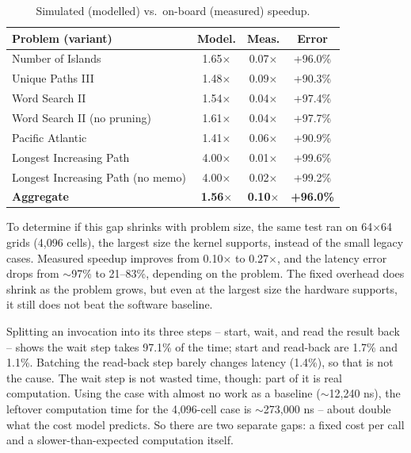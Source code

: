 \documentclass[conference]{IEEEtran}
\begin{document}
\begin{table}[h]
\centering
\footnotesize
\caption{Simulated (modelled) vs.\ on-board (measured) speedup.}
\label{tab:cost_model_correlation}
\renewcommand{\arraystretch}{1.15}
\begin{tabular}{@{}p{3.1cm}ccc@{}}
\toprule
\textbf{Problem (variant)} & \textbf{Model.} & \textbf{Meas.} & \textbf{Error} \\
\midrule
Number of Islands & 1.65$\times$ & 0.07$\times$ & +96.0\% \\
Unique Paths III & 1.48$\times$ & 0.09$\times$ & +90.3\% \\
Word Search II & 1.54$\times$ & 0.04$\times$ & +97.4\% \\
Word Search II (no pruning) & 1.61$\times$ & 0.04$\times$ & +97.7\% \\
Pacific Atlantic & 1.41$\times$ & 0.06$\times$ & +90.9\% \\
Longest Increasing Path & 4.00$\times$ & 0.01$\times$ & +99.6\% \\
Longest Increasing Path (no memo) & 4.00$\times$ & 0.02$\times$ & +99.2\% \\
\midrule
\textbf{Aggregate} & \textbf{1.56$\times$} & \textbf{0.10$\times$} & \textbf{+96.0\%} \\
\bottomrule
\end{tabular}
\end{table}

To determine if this gap shrinks with problem size, the same test ran on
64$\times$64 grids (4,096 cells), the largest size the kernel supports,
instead of the small legacy cases. Measured speedup improves from
0.10$\times$ to 0.27$\times$, and the latency error drops from
$\sim$97\% to 21--83\%, depending on the problem. The fixed overhead
does shrink as the problem grows, but even at the largest size the
hardware supports, it still does not beat the software baseline.

Splitting an invocation into its three steps -- start, wait, and read
the result back -- shows the wait step takes 97.1\% of the time; start
and read-back are 1.7\% and 1.1\%. Batching the read-back step barely
changes latency (1.4\%), so that is not the cause. The wait step is not
wasted time, though: part of it is real computation. Using the case
with almost no work as a baseline ($\sim$12,240 ns), the leftover
computation time for the 4,096-cell case is $\sim$273,000 ns -- about
double what the cost model predicts. So there are two separate gaps: a
fixed cost per call and a slower-than-expected computation itself.
\end{document}
